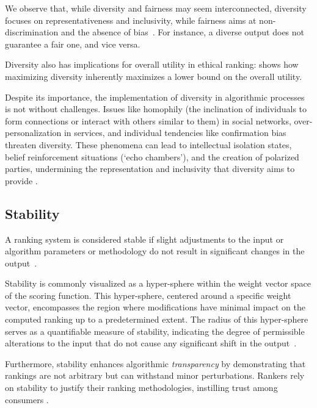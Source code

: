 We observe that, while diversity and fairness may seem interconnected, diversity focuses on representativeness and inclusivity, while fairness aims at non-discrimination and the absence of bias~\cite{pitoura2022fairness}. For instance, a diverse output does not guarantee a fair one, and vice versa.

Diversity also has implications for overall utility in ethical ranking: \cite{wang2021user} shows how maximizing diversity inherently maximizes a lower bound on the overall utility.

Despite its importance, the implementation of diversity in algorithmic processes is not without challenges. Issues like homophily (the inclination of individuals to form connections or interact with others similar to them) in social networks, over-personalization in services, and individual tendencies like confirmation bias threaten diversity. These phenomena can lead to intellectual isolation states, belief reinforcement situations (`echo chambers'), and the creation of polarized parties, undermining the representation and inclusivity that diversity aims to provide \cite{pitoura2022fairness}.


\subsection{Stability} 
\label{sec:stability}

A ranking system is considered stable if slight adjustments to the input or algorithm parameters or methodology do not result in significant changes in the output~\cite{asudeh2018obtaining}.

Stability is commonly visualized as a hyper-sphere within the weight vector space of the scoring function. This hyper-sphere, centered around a specific weight vector, encompasses the region where modifications have minimal impact on the computed ranking up to a predetermined extent. The radius of this hyper-sphere serves as a quantifiable measure of stability, indicating the degree of permissible alterations to the input that do not cause any significant shift in the output~\cite{soliman2011ranking}.

Furthermore, stability enhances algorithmic \emph{transparency} by demonstrating that rankings are not arbitrary but can withstand minor perturbations. Rankers rely on stability to justify their ranking methodologies, instilling trust among consumers \cite{yang2018nutritional}.
